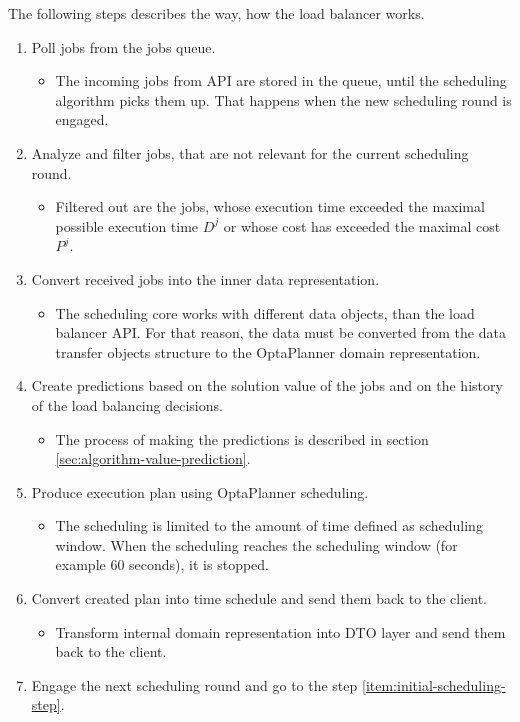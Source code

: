 \noindent
\begin{minipage}{\textwidth}
	The following steps describes the way, how the load balancer works.
	\begin{enumerate}
		\item \label{item:initial-scheduling-step} Poll jobs from the jobs queue.
		\begin{itemize}
			\item The incoming jobs from API are stored in the queue, 
			until the scheduling algorithm picks them up.
			That happens when the new scheduling round is engaged.
		\end{itemize}
	
		\item Analyze and filter jobs, that are not relevant for the current scheduling round.
		\begin{itemize}
			\item Filtered out are the jobs,
			 whose execution time exceeded the maximal possible execution time $D^{j}$
			 or whose cost has exceeded the maximal cost $P^{j}$.
		\end{itemize}
	
		\item Convert received jobs into the inner data representation.
		\begin{itemize}
			\item The scheduling core works with different data objects,
			than the load balancer API.
			For that reason,
			the data must be converted from the data transfer objects structure
			to the OptaPlanner domain representation.
		\end{itemize}
	
		\item Create predictions based on the solution value of the jobs 
		and on the history of the load balancing decisions.
		\begin{itemize}
			\item The process of making the predictions is described in section \ref{sec:algorithm-value-prediction}.
		\end{itemize}
	
		\item Produce execution plan using OptaPlanner scheduling.
		\begin{itemize}
			\item The scheduling is limited to the amount of time defined as scheduling window.
			When the scheduling reaches the scheduling window (for example 60 seconds),
			it is stopped.
		\end{itemize}
	
		\item Convert created plan into time schedule and send them back to the client.
		\begin{itemize}
			\item Transform internal domain representation into DTO layer and send them back to the client.
		\end{itemize}
	
		\item Engage the next scheduling round and go to the step \ref{item:initial-scheduling-step}.
	\end{enumerate}	
\end{minipage}
\bigskip